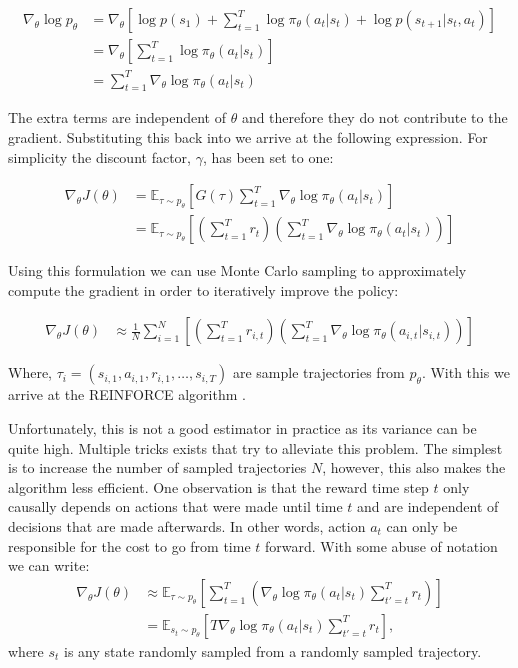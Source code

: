 \begin{align}
    \nabla_\theta \log p_\theta &= \nabla_\theta \left[ \log p(s_1) + \sum_{t=1}^T \log \pi_\theta(a_t|s_t) + \log p(s_{t+1} | s_t, a_t) \right]\\
    &= \nabla_\theta \left[ \sum_{t=1}^T \log \pi_\theta(a_t|s_t) \right]\\
    &= \sum_{t=1}^T \nabla_\theta \log \pi_\theta(a_t|s_t)
\end{align}

The extra terms are independent of $\theta$ and therefore they do not contribute to the gradient. Substituting this back into  we arrive at the following expression. For simplicity the discount factor, $\gamma$, has been set to one:

\begin{align}
    \nabla_\theta J(\theta) &= \mathbb{E}_{\tau \sim p_\theta} \left[ G(\tau) \sum_{t=1}^T \nabla_\theta \log \pi_\theta(a_t|s_t) \right]\\
    &= \mathbb{E}_{\tau \sim p_\theta} \left[ \left( \sum_{t=1}^T r_t \right) \left( \sum_{t=1}^T \nabla_\theta \log \pi_\theta(a_t|s_t) \right) \right]
\end{align}

Using this formulation we can use Monte Carlo sampling \cite{SHAPIRO2003353} to approximately compute the gradient in order to iteratively improve the policy:


\begin{align}
    \nabla_\theta J(\theta) &\approx \frac{1}{N} \sum_{i=1}^{N} \left[ \left( \sum_{t=1}^T r_{i,t} \right) \left( \sum_{t=1}^T \nabla_\theta \log \pi_\theta(a_{i,t}|s_{i,t}) \right) \right]
\end{align}

Where, $\tau_i = (s_{i,1}, a_{i,1}, r_{i,1}, \dots, s_{i,T})$ are sample trajectories from $p_\theta$. With this we arrive at the REINFORCE algorithm \cite{williams1992simple}.

Unfortunately, this is not a good estimator in practice as its variance can be quite high. Multiple tricks exists that try to alleviate this problem. The simplest is to increase the number of sampled trajectories $N$, however, this also makes the algorithm less efficient. One observation is that the reward time step $t$ only causally depends on actions that were made until time $t$ and are independent of decisions that are made afterwards. In other words, action $a_t$ can only be responsible for the cost to go from time $t$ forward. With some abuse of notation we can write:
\begin{align}
    \nabla_\theta J(\theta) &\approx \mathbb{E}_{\tau \sim p_\theta} \left[ \sum_{t=1}^T \left( \nabla_\theta \log \pi_\theta(a_t|s_t)  \sum_{t'=t}^T r_t \right) \right]\\
    &= \mathbb{E}_{s_t \sim p_\theta} \left[T \nabla_\theta \log \pi_\theta(a_t|s_t)  \sum_{t'=t}^T r_t \right],
\end{align}
where $s_t$ is any state randomly sampled from a randomly sampled trajectory.

